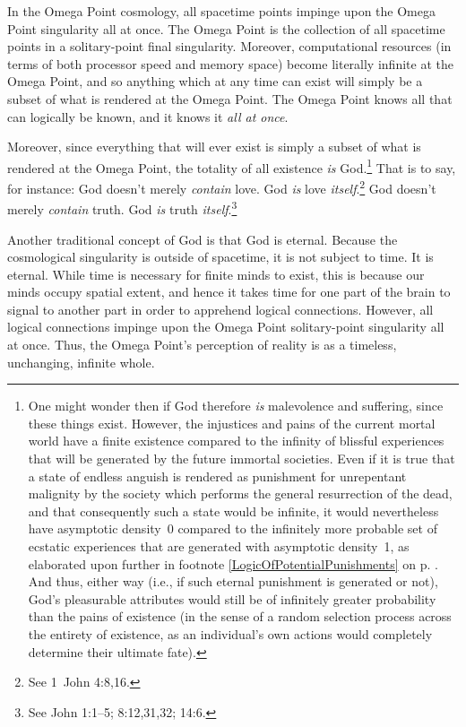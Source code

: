 \documentclass[letterpaper,12pt]{article}
\begin{document}
In the Omega Point cosmology, all spacetime points impinge upon the Omega Point singularity all at once. The Omega Point is the collection of all spacetime points in a solitary-point final singularity. Moreover, computational resources (in terms of both processor speed and memory space) become literally infinite at the Omega Point, and so anything which at any time can exist will simply be a subset of what is rendered at the Omega Point. The Omega Point knows all that can logically be known, and it knows it \emph{all at once}.

Moreover, since everything that will ever exist is simply a subset of what is rendered at the Omega Point, the totality of all existence \emph{is} God.\footnote{One might wonder then if God therefore \emph{is} malevolence and suffering, since these things exist. However, the injustices and pains of the current mortal world have a finite existence compared to the infinity of blissful experiences that will be generated by the future immortal societies. Even if it is true that a state of endless anguish is rendered as punishment for unrepentant malignity by the society which performs the general resurrection of the dead, and that consequently such a state would be infinite, it would nevertheless have asymptotic density~0 compared to the infinitely more probable set of ecstatic experiences that are generated with asymptotic density~1, as elaborated upon further in footnote \ref{LogicOfPotentialPunishments} on p. \pageref{AsymptoticDensityAndPunishment}. And thus, either way (i.e., if such eternal punishment is generated or not), God's pleasurable attributes would still be of infinitely greater probability than the pains of existence (in the sense of a random selection process across the entirety of existence, as an individual's own actions would completely determine their ultimate fate).} That is to say, for instance: God doesn't merely \emph{contain} love. God \emph{is} love \emph{itself}.\footnote{See 1~John 4:8,16.} God doesn't merely \emph{contain} truth. God \emph{is} truth \emph{itself}.\footnote{See John 1:1--5; 8:12,31,32; 14:6.}


Another traditional concept of God is that God is eternal. Because the cosmological singularity is outside of spacetime, it is not subject to time. It is eternal. While time is necessary for finite minds to exist, this is because our minds occupy spatial extent, and hence it takes time for one part of the brain to signal to another part in order to apprehend logical connections. However, all logical connections impinge upon the Omega Point solitary-point singularity all at once. Thus, the Omega Point's perception of reality is as a timeless, unchanging, infinite whole.
\end{document}
